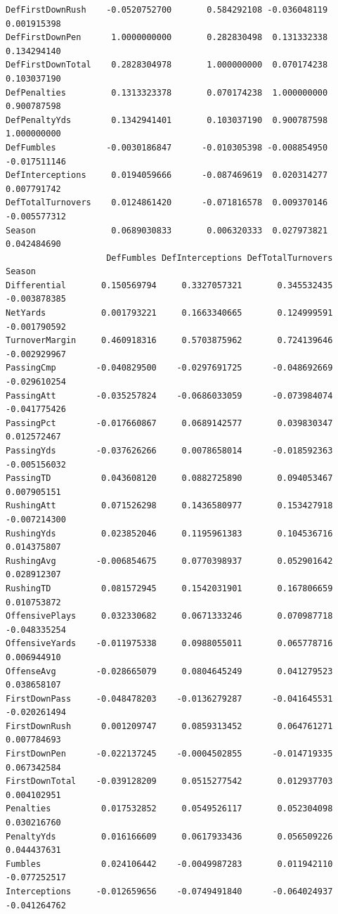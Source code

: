 \documentclass[
  letterpaper,
  DIV=11,
  numbers=noendperiod]{scrreprt}
\begin{document}
\begin{verbatim}
DefFirstDownRush    -0.0520752700       0.584292108 -0.036048119   0.001915398
DefFirstDownPen      1.0000000000       0.282830498  0.131332338   0.134294140
DefFirstDownTotal    0.2828304978       1.000000000  0.070174238   0.103037190
DefPenalties         0.1313323378       0.070174238  1.000000000   0.900787598
DefPenaltyYds        0.1342941401       0.103037190  0.900787598   1.000000000
DefFumbles          -0.0030186847      -0.010305398 -0.008854950  -0.017511146
DefInterceptions     0.0194059666      -0.087469619  0.020314277   0.007791742
DefTotalTurnovers    0.0124861420      -0.071816578  0.009370146  -0.005577312
Season               0.0689030833       0.006320333  0.027973821   0.042484690
                    DefFumbles DefInterceptions DefTotalTurnovers       Season
Differential       0.150569794     0.3327057321       0.345532435 -0.003878385
NetYards           0.001793221     0.1663340665       0.124999591 -0.001790592
TurnoverMargin     0.460918316     0.5703875962       0.724139646 -0.002929967
PassingCmp        -0.040829500    -0.0297691725      -0.048692669 -0.029610254
PassingAtt        -0.035257824    -0.0686033059      -0.073984074 -0.041775426
PassingPct        -0.017660867     0.0689142577       0.039830347  0.012572467
PassingYds        -0.037626266     0.0078658014      -0.018592363 -0.005156032
PassingTD          0.043608120     0.0882725890       0.094053467  0.007905151
RushingAtt         0.071526298     0.1436580977       0.153427918 -0.007214300
RushingYds         0.023852046     0.1195961383       0.104536716  0.014375807
RushingAvg        -0.006854675     0.0770398937       0.052901642  0.028912307
RushingTD          0.081572945     0.1542031901       0.167806659  0.010753872
OffensivePlays     0.032330682     0.0671333246       0.070987718 -0.048335254
OffensiveYards    -0.011975338     0.0988055011       0.065778716  0.006944910
OffenseAvg        -0.028665079     0.0804645249       0.041279523  0.038658107
FirstDownPass     -0.048478203    -0.0136279287      -0.041645531 -0.020261494
FirstDownRush      0.001209747     0.0859313452       0.064761271  0.007784693
FirstDownPen      -0.022137245    -0.0004502855      -0.014719335  0.067342584
FirstDownTotal    -0.039128209     0.0515277542       0.012937703  0.004102951
Penalties          0.017532852     0.0549526117       0.052304098  0.030216760
PenaltyYds         0.016166609     0.0617933436       0.056509226  0.044437631
Fumbles            0.024106442    -0.0049987283       0.011942110 -0.077252517
Interceptions     -0.012659656    -0.0749491840      -0.064024937 -0.041264762

\end{verbatim}
\end{document}
